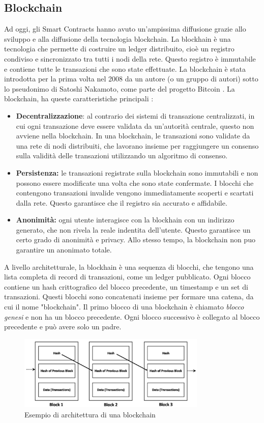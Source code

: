 \documentclass[../../Thesis.tex]{subfiles}
\begin{document}
\subsection{Blockchain}
Ad oggi, gli Smart Contracts hanno avuto un'ampissima diffusione grazie allo sviluppo  e alla diffusione della tecnologia blockchain. La blockhain è una tecnologia che permette di costruire un ledger distribuito, cioè un registro condiviso e sincronizzato tra tutti i nodi della rete. Questo registro è immutabile e contiene tutte le transazioni che sono state effettuate. La blockchain è stata introdotta per la prima volta nel 2008 da un autore (o un gruppo di autori) sotto lo pseudonimo di Satoshi Nakamoto, come parte del progetto Bitcoin \cite{Bitcoin}. La blockchain, ha queste caratteristiche principali \cite{Blockchain}:
\begin{itemize}
    \item \textbf{Decentralizzazione}: al contrario dei sistemi di transazione centralizzati, in cui ogni transazione deve essere validata da un'autorità centrale, questo non avviene nella blockchain. In una blockchain, le transazioni sono validate da una rete di nodi distribuiti, che lavorano insieme per raggiungere un consenso sulla validità delle transazioni utilizzando un algoritmo di consenso.
    \item \textbf{Persistenza:} le transazioni registrate sulla blockchain sono immutabili e non possono essere modificate una volta che sono state confermate. I blocchi che contengono transazioni invalide vengono immediatamente scoperti e scartati dalla rete. Questo garantisce che il registro sia accurato e affidabile.
    \item \textbf{Anonimità:} ogni utente interagisce con la blockhain con un indirizzo generato, che non rivela la reale indentita dell'utente. Questo garantisce un certo grado di anonimità e privacy. Allo stesso tempo, la blockchain non puo garantire un anonimato totale. 
\end{itemize}
A livello architetturale, la blockhain è una sequenza di blocchi, che tengono una lista completa di record di transazioni, come un ledger pubblicato. Ogni blocco contiene un hash crittografico del blocco precedente, un timestamp e un set di transazioni. Questi blocchi sono concatenati insieme per formare una catena, da cui il nome "blockchain". Il primo blocco di una blockchain è chiamato \emph{blocco genesi} e non ha un blocco precedente. Ogni blocco successivo è collegato al blocco precedente e può avere solo un padre.
\begin{figure}[h!]
    \centering
    \includegraphics[width=0.8\textwidth]{../../img/Blockchain.png}
    \caption{Esempio di architettura di una blockchain}
    \label{fig:Blockchain}
\end{figure}
\end{document}
